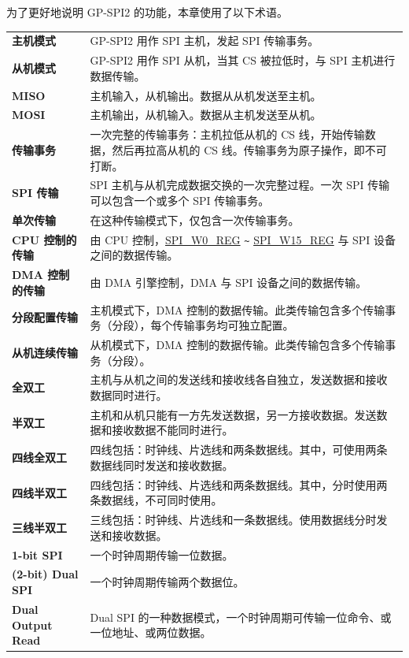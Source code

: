 为了更好地说明 GP-SPI2 的功能，本章使用了以下术语。

\begin{longtable}[c]{ R{4cm} p{10cm} }

\textbf{主机模式}     & GP-SPI2 用作 SPI 主机，发起 SPI 传输事务。\\
\textbf{从机模式}      & GP-SPI2 用作 SPI 从机，当其 CS 被拉低时，与 SPI 主机进行数据传输。\\
\textbf{MISO}       & 主机输入，从机输出。数据从从机发送至主机。\\
\textbf{MOSI}  & 主机输出，从机输入。数据从主机发送至从机。\\
\textbf{传输事务} & 一次完整的传输事务：主机拉低从机的 CS 线，开始传输数据，然后再拉高从机的 CS 线。传输事务为原子操作，即不可打断。\\
\textbf{SPI 传输} & SPI 主机与从机完成数据交换的一次完整过程。一次 SPI 传输可以包含一个或多个 SPI 传输事务。\\
\textbf{单次传输} & 在这种传输模式下，仅包含一次传输事务。\\
\textbf{CPU 控制的传输}& 由 CPU 控制，\hyperref[regdesc:SPIW0REG]{SPI\_W0\_REG} \verb+~+ \hyperref[regdesc:SPIW15REG]{SPI\_W15\_REG} 与 SPI 设备之间的数据传输。\\
\textbf{DMA 控制的传输}& 由 DMA 引擎控制，DMA 与 SPI 设备之间的数据传输。\\
\textbf{分段配置传输}& 主机模式下，DMA 控制的数据传输。此类传输包含多个传输事务（分段），每个传输事务均可独立配置。\\
\textbf{从机连续传输} & 从机模式下，DMA 控制的数据传输。此类传输包含多个传输事务（分段）。\\
\textbf{全双工} & 主机与从机之间的发送线和接收线各自独立，发送数据和接收数据同时进行。\\
\textbf{半双工} & 主机和从机只能有一方先发送数据，另一方接收数据。发送数据和接收数据不能同时进行。\\
\textbf{四线全双工} & 四线包括：时钟线、片选线和两条数据线。其中，可使用两条数据线同时发送和接收数据。\\
\textbf{四线半双工} & 四线包括：时钟线、片选线和两条数据线。其中，分时使用两条数据线，不可同时使用。\\
\textbf{三线半双工} & 三线包括：时钟线、片选线和一条数据线。使用数据线分时发送和接收数据。\\
\textbf{1-bit SPI} & 一个时钟周期传输一位数据。\\ 
\textbf{(2-bit) Dual SPI} & 一个时钟周期传输两个数据位。\\
\textbf{Dual Output Read} & Dual SPI 的一种数据模式，一个时钟周期可传输一位命令、或一位地址、或两位数据。\\

\end{longtable}
